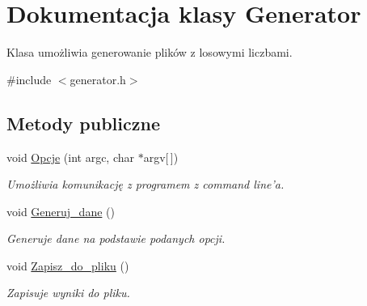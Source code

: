 \hypertarget{class_generator}{\section{\-Dokumentacja klasy \-Generator}
\label{class_generator}
}


\-Klasa umożliwia generowanie plików z losowymi liczbami.  




{\ttfamily \#include $<$generator.\-h$>$}

\subsection*{\-Metody publiczne}
\begin{DoxyCompactItemize}
\item 
void \hyperlink{class_generator_a413249832b5c3e5a8540447ec86b213b}{\-Opcje} (int argc, char $\ast$argv\mbox{[}$\,$\mbox{]})
\begin{DoxyCompactList}\small\item\em \-Umożliwia komunikację z programem z command line'a. \end{DoxyCompactList}\item 
void \hyperlink{class_generator_a6be92197273a36ae62a04ab9de172634}{\-Generuj\-\_\-dane} ()
\begin{DoxyCompactList}\small\item\em \-Generuje dane na podstawie podanych opcji. \end{DoxyCompactList}\item 
void \hyperlink{class_generator_a3ba9c49d0bd275d62ea7800ba9c29f3d}{\-Zapisz\-\_\-do\-\_\-pliku} ()
\begin{DoxyCompactList}\small\item\em \-Zapisuje wyniki do pliku. \end{DoxyCompactList}\end{DoxyCompactItemize}
